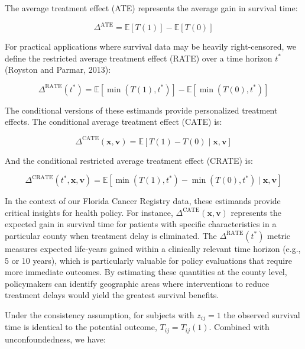 \documentclass[useAMS,referee]{biom}
\begin{document}
The average treatment effect (ATE) represents the average gain in survival time:

\begin{equation}
\Delta^{\text{ATE}} = \mathbb{E}[T(1)] - \mathbb{E}[T(0)]
\end{equation}

For practical applications where survival data may be heavily right-censored, we define the restricted average treatment effect (RATE) over a time horizon $t^*$ (Royston and Parmar, 2013):

\begin{equation}
\Delta^{\text{RATE}}(t^*) = \mathbb{E}[\min(T(1), t^*)] - \mathbb{E}[\min(T(0), t^*)]
\end{equation}

The conditional versions of these estimands provide personalized treatment effects. The conditional average treatment effect (CATE) is:

\begin{equation}
\Delta^{\text{CATE}}(\mathbf{x}, \mathbf{v}) = \mathbb{E}[T(1) - T(0) \mid \mathbf{x}, \mathbf{v}]
\end{equation}

And the conditional restricted average treatment effect (CRATE) is:

\begin{equation}
\Delta^{\text{CRATE}}(t^*, \mathbf{x}, \mathbf{v}) = \mathbb{E}[\min(T(1), t^*) - \min(T(0), t^*) \mid \mathbf{x}, \mathbf{v}]
\end{equation}

In the context of our Florida Cancer Registry data, these estimands provide critical insights for health policy. For instance, $\Delta^{\text{CATE}}(\mathbf{x}, \mathbf{v})$ represents the expected gain in survival time for patients with specific characteristics in a particular county when treatment delay is eliminated. The $\Delta^{\text{RATE}}(t^*)$ metric measures expected life-years gained within a clinically relevant time horizon (e.g., 5 or 10 years), which is particularly valuable for policy evaluations that require more immediate outcomes. By estimating these quantities at the county level, policymakers can identify geographic areas where interventions to reduce treatment delays would yield the greatest survival benefits.

Under the consistency assumption, for subjects with $z_{ij}=1$ the observed survival time is identical to the potential outcome, $T_{ij} = T_{ij}(1)$. Combined with unconfoundedness, we have:
\end{document}

